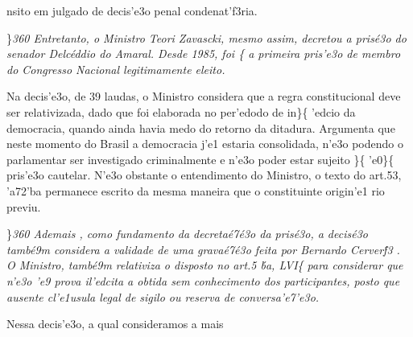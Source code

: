  \ltrch{}  nsito em julgado de
decis'e3o penal condenat'f3ria.
\par \}\pard \ltrpar\qj {}\sl360\widctlpar\wrapdefault\aspalpha\aspnum\faauto\adjustright{} {\rtlch{}  \ltrch{}  \tab 
Entretanto, o Ministro Teori Zavascki, mesmo assim, decretou a pris\'e3o do senador Delc\'eddio do Amaral. Desde 1985, }{\rtlch{}  \ltrch{}  foi }\{\rtlch{}
 \ltrch{}  a primeira pris'e3o de
membro do Congresso Nacional legitimamente eleito. \par \tab Na
decis'e3o, de 39 laudas, o Ministro considera que a regra constitucional
deve ser relativizada, dado que foi elaborada no per'edodo de
in\}\{\rtlch{}  \ltrch{} 
'edcio da democracia, quando ainda havia medo do retorno da ditadura.
Argumenta que neste momento do Brasil a democracia j'e1 estaria
consolidada, n'e3o podendo o parlamentar ser investigado criminalmente e
n'e3o poder estar sujeito \}\{\rtlch{}  \ltrch{}
 'e0\}\{\rtlch{}  \ltrch{}
 pris'e3o cautelar. N'e3o obstante o
entendimento do Ministro, o texto do art.53, 'a72'ba permanece escrito
da mesma maneira que o constituinte origin'e1 rio previu.
\par \}\pard \ltrpar\qj {}\sl360\widctlpar\wrapdefault\aspalpha\aspnum\faauto\adjustright{} {\rtlch{}  \ltrch{}  Ademais}{\rtlch{}  \ltrch{} 
 , como fundamento da decreta\'e7\'e3o da pris\'e3o, a decis\'e3o tamb\'e9m considera a validade de uma grava\'e7\'e3o feita por }{\rtlch{}  \ltrch{}  Bernardo }{\rtlch{}  
\ltrch{}  Cerver\'f3}{\rtlch{}  \ltrch{}  . O}{\rtlch{}  \ltrch{}   Ministro, tamb\'e9m }{\rtlch{}  \ltrch{}  
relativiza o disposto no art.5}{\rtlch{}  \ltrch{}  \'ba,}{\rtlch{}  \ltrch{}   LVI}\{\rtlch{}
 \ltrch{}  para considerar que
n'e3o 'e9 prova il'edcita a obtida sem conhecimento dos participantes,
posto que ausente cl'e1usula legal de sigilo ou reserva de
conversa'e7'e3o. \par Nessa decis'e3o, a qual consideramos a mais
